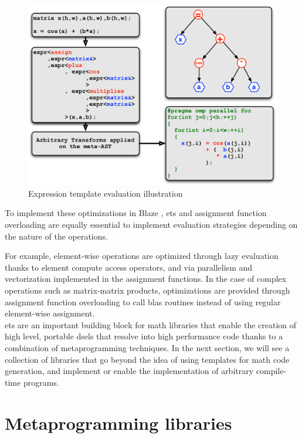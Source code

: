 \documentclass[../main]{subfiles}
\begin{document}
\begin{figure}[h]
\includegraphics[width=\textwidth]{images/expressiontemplates.pdf}
\caption{
  Expression template evaluation illustration\cite{falcou-hdr}
}
\label{fig:expression-template-illustration}
\end{figure}

To implement these optimizations in Blaze \cite{blazelib},
\glspl{et} and assignment function overloading are equally essential
to implement evaluation strategies depending on the nature of the operations.

For example, element-wise operations are optimized through lazy evaluation
thanks to element compute access operators, and via parallelism
and vectorization implemented in the assignment functions.
In the case of complex operations such as matrix-matrix products,
optimizations are provided through assignment function overloading
to call \gls{blas} routines instead of using regular element-wise assignment.
\\

\Glspl{et} are an important building block for \cpp math libraries that
enable the creation of high level, portable \glspl{dsel} that resolve into
high performance code thanks to a combination of metaprogramming techniques.
In the next section, we will see a collection of libraries that go beyond the
idea of using templates for math code generation, and implement or enable the
implementation of arbitrary compile-time programs.

\section{
  Metaprogramming libraries
}
\label{lbl:meta-libraries}
\end{document}
